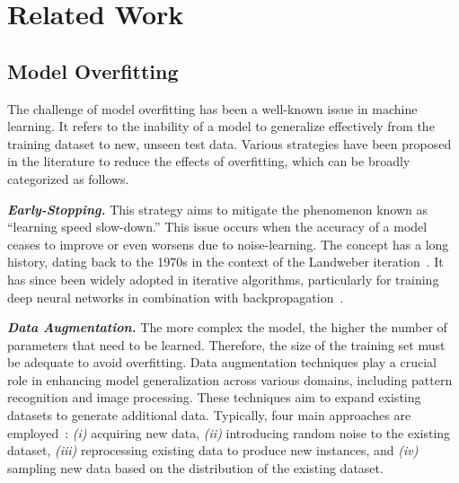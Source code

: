 \section{Related Work}
\label{sec:related}

\subsection{Model Overfitting}
\label{subsec:overfitting}
The challenge of model overfitting has been a well-known issue in machine learning. It refers to the inability of a model to generalize effectively from the training dataset to new, unseen test data.
%
%
Various strategies have been proposed in the literature to reduce the effects of overfitting, which can be broadly categorized as follows.

\smallskip
\noindent \textit{\textbf{Early-Stopping.}} This strategy aims to mitigate the phenomenon known as ``learning speed slow-down.'' This issue occurs when the accuracy of a model ceases to improve or even worsens due to noise-learning. The concept has a long history, dating back to the 1970s in the context of the Landweber iteration~\citep{raskutti2011ccc}. It has since been widely adopted in iterative algorithms, particularly for training deep neural networks in combination with backpropagation~\citep{caruana2000neurips}.

\smallskip
\noindent \textit{\textbf{Data Augmentation.}} The more complex the model, the higher the number of parameters that need to be learned. Therefore, the size of the training set must be adequate to avoid overfitting. Data augmentation techniques play a crucial role in enhancing model generalization across various domains, including pattern recognition and image processing. These techniques aim to expand existing datasets to generate additional data. Typically, four main approaches are employed~\citep{sun2014cvpr,karystinos2000tnn,yip2008bio}: \textit{(i)} acquiring new data, \textit{(ii)} introducing random noise to the existing dataset, \textit{(iii)} reprocessing existing data to produce new instances, and \textit{(iv)} sampling new data based on the distribution of the existing dataset.

